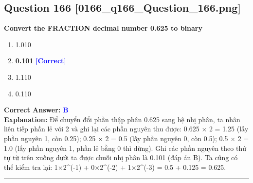 \documentclass[11pt,a4paper]{article}
\begin{document}
\begin{minipage}{\textwidth}
\subsection*{Question 166 \quad \footnotesize{[0166\_q166\_Question\_166.png]}}
\noindent \textbf{Convert the FRACTION decimal number 0.625 to binary}

\begin{enumerate}[label=\Alph*.]
    \item 1.010
    \item \textbf{0.101} \hfill \textcolor{blue}{\textbf{[Correct]}}
    \item 1.110
    \item 0.110
\end{enumerate}

\noindent \textbf{Correct Answer:} \textcolor{blue}{\textbf{B}} \\[2pt]
\noindent \textbf{Explanation:} Để chuyển đổi phần thập phân 0.625 sang hệ nhị phân, ta nhân liên tiếp phần lẻ với 2 và ghi lại các phần nguyên thu được: 0.625 × 2 = 1.25 (lấy phần nguyên 1, còn 0.25); 0.25 × 2 = 0.5 (lấy phần nguyên 0, còn 0.5); 0.5 × 2 = 1.0 (lấy phần nguyên 1, phần lẻ bằng 0 thì dừng). Ghi các phần nguyên theo thứ tự từ trên xuống dưới ta được chuỗi nhị phân là 0.101 (đáp án B). Ta cũng có thể kiểm tra lại: 1×2\textasciicircum{}(-1) + 0×2\textasciicircum{}(-2) + 1×2\textasciicircum{}(-3) = 0.5 + 0.125 = 0.625.

\par\vspace{0.3cm}
\hrule
\vspace{0.3cm}
\end{minipage}
\end{document}
